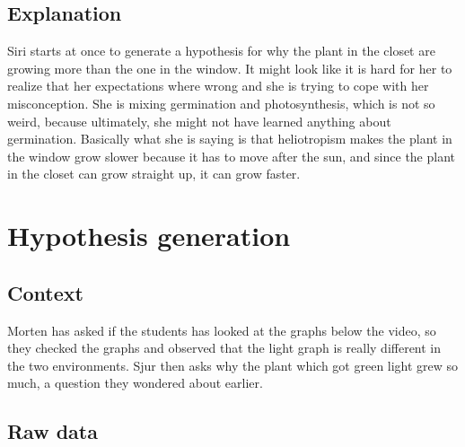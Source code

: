 \subsection{Explanation}
Siri starts at once to generate a hypothesis for why the plant in the closet are growing more than the one in the window. It might look like it is hard for her to realize that her expectations where wrong and she is trying to cope with her misconception. She is mixing germination and photosynthesis, which is not so weird, because ultimately, she might not have learned anything about germination. Basically what she is saying is that heliotropism makes the plant in the window grow slower because it has to move after the sun, and since the plant in the closet can grow straight up, it can grow faster. 

\section{Hypothesis generation}

\subsection{Context}
Morten has asked if the students has looked at the graphs below the video, so they checked the graphs and observed that the light graph is really different in the two environments. Sjur then asks why the plant which got green light grew so much, a question they wondered about earlier. 

\subsection{Raw data}

